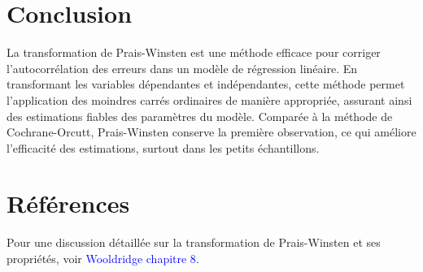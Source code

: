 \documentclass[14pt]{extarticle} %
\theoremstyle{definition}
\theoremstyle{plain}
\begin{document}
\section{Conclusion}
La transformation de Prais-Winsten est une méthode efficace pour corriger l'autocorrélation des erreurs dans un modèle de régression linéaire. En transformant les variables dépendantes et indépendantes, cette méthode permet l'application des moindres carrés ordinaires de manière appropriée, assurant ainsi des estimations fiables des paramètres du modèle. Comparée à la méthode de Cochrane-Orcutt, Prais-Winsten conserve la première observation, ce qui améliore l'efficacité des estimations, surtout dans les petits échantillons.

\section{Références}
Pour une discussion détaillée sur la transformation de Prais-Winsten et ses propriétés, voir \textcolor{blue}{Wooldridge chapitre 8}.
\end{document}
